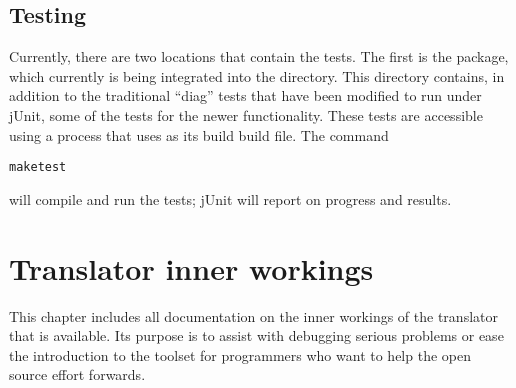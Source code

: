 {\section{Testing}
Currently, there are two locations that contain the tests. The first
is the  package, which currently is
being integrated into the  directory. This
directory contains, in addition to the traditional ``diag'' tests that
have been modified to run under jUnit, some of the tests for the newer
functionality. These tests are accessible using a 
process that uses  as its build build file. The
command
\begin{alltt}
make test
\end{alltt}
will compile and run the tests; jUnit will report on progress and
results.




\chapter{Translator inner workings}
This chapter includes all documentation on the inner workings of the
translator that is available. Its purpose is to assist with debugging
serious problems or ease the introduction to the toolset for
programmers who want to help the open source effort forwards.
}
